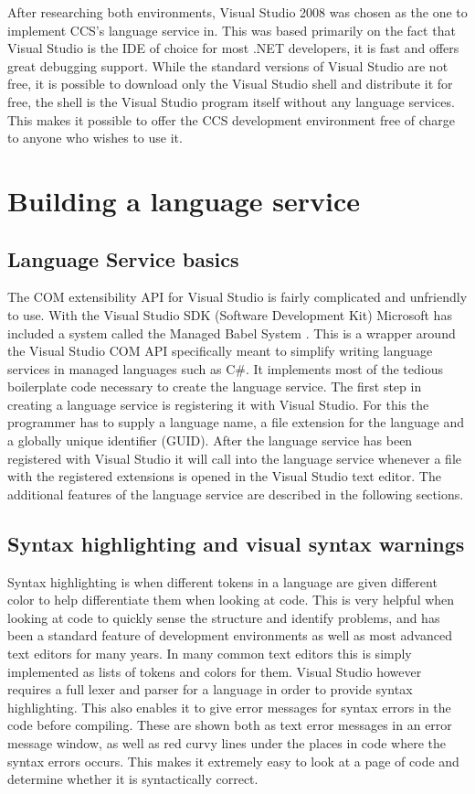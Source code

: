 	After researching both environments, Visual Studio 2008 was chosen as the one
	to implement CCS's language service in. This was based primarily on the fact
	that Visual Studio is the IDE of choice for most .NET developers, it is fast 
	and offers great debugging support. While the standard versions of Visual 
	Studio are not free, it is possible to download only the Visual Studio shell 
	and distribute it for free, the shell is the Visual Studio program itself 
	without any language services. This makes it possible to offer the CCS 
	development environment free of charge to anyone who wishes to use it.

\section{Building a language service}
	
	\subsection{Language Service basics}	
	The COM extensibility API for Visual Studio is fairly complicated and 
	unfriendly to use. With the Visual Studio SDK (Software Development Kit) 
	Microsoft has included a system called the Managed Babel System 
	\cite{babel}. This is a wrapper around the Visual Studio COM API 
	specifically meant to simplify writing language services in managed 
	languages such as C\#. It implements most of the tedious boilerplate code 
	necessary to create the language service. The first step in creating a 
	language service is registering it with Visual Studio. For this the 
	programmer has to supply a language name, a file extension for the language 
	and a globally unique identifier (GUID). After the language service has been 
	registered with Visual Studio it will call into the language service 
	whenever a file with the registered extensions is opened in the Visual 
	Studio text editor. The additional features of the language service are 
	described in the following sections.
	
	\subsection{Syntax highlighting and visual syntax warnings}
	Syntax highlighting is when different tokens in a language are given 
	different color to help differentiate them when looking at code. This
	is very helpful when looking at code to quickly sense the structure and
	identify problems, and has been a standard feature of development 
	environments as well as most advanced text editors for many years. In many
	common text editors this is simply implemented as lists of tokens and 
	colors for them. Visual Studio however requires a full lexer and parser for
	a language in order to provide syntax highlighting. This also enables it to
	give error messages for syntax errors in the code before compiling. These
	are shown both as text error messages in an error message window, as well
	as red curvy lines under the places in code where the syntax errors occurs.
	This makes it extremely easy to look at a page of code and determine whether
	it is syntactically correct.
	
